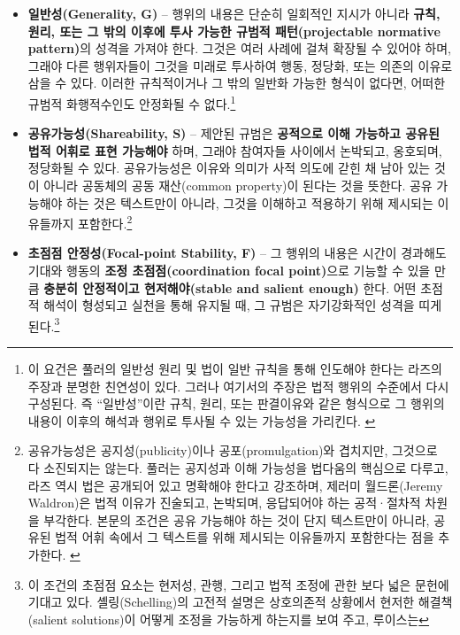 \documentclass[12pt,a4paper]{article}
\begin{document}
\begin{itemize}
\item
  \textbf{일반성(Generality, G)} -- 행위의 내용은 단순히 일회적인 지시가
  아니라 \textbf{규칙, 원리, 또는 그 밖의 이후에 투사 가능한 규범적
  패턴(projectable normative pattern)}의 성격을 가져야 한다. 그것은 여러
  사례에 걸쳐 확장될 수 있어야 하며, 그래야 다른 행위자들이 그것을
  미래로 투사하여 행동, 정당화, 또는 의존의 이유로 삼을 수 있다. 이러한
  규칙적이거나 그 밖의 일반화 가능한 형식이 없다면, 어떠한 규범적
  화행적수인도 안정화될 수 없다.\footnote{이 요건은 풀러의 일반성 원리
    및 법이 일반 규칙을 통해 인도해야 한다는 라즈의 주장과 분명한
    친연성이 있다. 그러나 여기서의 주장은 법적 행위의 수준에서 다시
    구성된다. 즉 ``일반성''이란 규칙, 원리, 또는 판결이유와 같은
    형식으로 그 행위의 내용이 이후의 해석과 행위로 투사될 수 있는
    가능성을 가리킨다. \autocite{Fuller1969,Raz1979RuleOfLaw}}
\item
  \textbf{공유가능성(Shareability, S)} -- 제안된 규범은 \textbf{공적으로
  이해 가능하고 공유된 법적 어휘로 표현 가능해야} 하며, 그래야 참여자들
  사이에서 논박되고, 옹호되며, 정당화될 수 있다. 공유가능성은 이유와
  의미가 사적 의도에 갇힌 채 남아 있는 것이 아니라 공동체의 공동
  재산(common property)이 된다는 것을 뜻한다. 공유 가능해야 하는 것은
  텍스트만이 아니라, 그것을 이해하고 적용하기 위해 제시되는 이유들까지
  포함한다.\footnote{공유가능성은 공지성(publicity)이나
    공포(promulgation)와 겹치지만, 그것으로 다 소진되지는 않는다. 풀러는
    공지성과 이해 가능성을 법다움의 핵심으로 다루고, 라즈 역시 법은
    공개되어 있고 명확해야 한다고 강조하며, 제러미 월드론(Jeremy
    Waldron)은 법적 이유가 진술되고, 논박되며, 응답되어야 하는
    공적·절차적 차원을 부각한다. 본문의 조건은 공유 가능해야 하는 것이
    단지 텍스트만이 아니라, 공유된 법적 어휘 속에서 그 텍스트를 위해
    제시되는 이유들까지 포함한다는 점을 추가한다. \autocite{Fuller1969,Raz1979RuleOfLaw,Waldron2011}}
\item
  \textbf{초점점 안정성(Focal-point Stability, F)} -- 그 행위의 내용은
  시간이 경과해도 기대와 행동의 \textbf{조정 초점점(coordination focal
  point)}으로 기능할 수 있을 만큼 \textbf{충분히 안정적이고
  현저해야(stable and salient enough)} 한다. 어떤 초점적 해석이 형성되고
  실천을 통해 유지될 때, 그 규범은 자기강화적인 성격을 띠게
  된다.\footnote{이 조건의 초점점 요소는 현저성, 관행, 그리고 법적
    조정에 관한 보다 넓은 문헌에 기대고 있다. 셸링(Schelling)의 고전적
    설명은 상호의존적 상황에서 현저한 해결책(salient solutions)이 어떻게
    조정을 가능하게 하는지를 보여 주고\autocite{Schelling1960}, 루이스는
}
\end{itemize}
\end{document}
